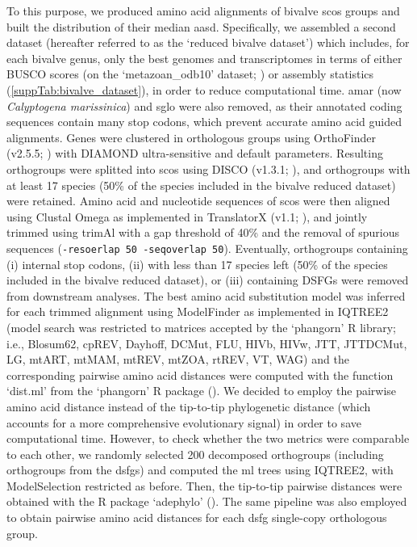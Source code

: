 To this purpose, we produced amino acid alignments of bivalve \glspl{sco} groups and built the distribution of their median \gls{aasd}. Specifically, we assembled a second dataset (hereafter referred to as the ‘reduced bivalve dataset’) which includes, for each bivalve genus, only the best genomes and transcriptomes in terms of either BUSCO scores (on the ‘metazoan\_odb10’ dataset; ) or assembly statistics (\cref{suppTab:bivalve_dataset}), in order to reduce computational time. \gls{amar} (now \textit{Calyptogena marissinica}) and \gls{sglo} were also removed, as their annotated coding sequences contain many stop codons, which prevent accurate amino acid guided alignments. Genes were clustered in orthologous groups using OrthoFinder (v2.5.5; ) with DIAMOND ultra-sensitive and default parameters. Resulting orthogroups were splitted into \glspl{sco} using DISCO (v1.3.1; ), and orthogroups with at least 17 species (50\% of the species included in the bivalve reduced dataset) were retained. Amino acid and nucleotide sequences of \glspl{sco} were then aligned using Clustal Omega as implemented in TranslatorX (v1.1; ), and jointly trimmed using trimAl with a gap threshold of 40\% and the removal of spurious sequences (\verb|-resoerlap 50 -seqoverlap 50|). Eventually, orthogroups containing (i) internal stop codons, (ii) with less than 17 species left (50\% of the species included in the bivalve reduced dataset), or (iii) containing DSFGs were removed from downstream analyses. The best amino acid substitution model was inferred for each trimmed alignment using ModelFinder as implemented in IQTREE2 (model search was restricted to matrices accepted by the ‘phangorn’ R library; i.e., Blosum62, cpREV, Dayhoff, DCMut, FLU, HIVb, HIVw, JTT, JTTDCMut, LG, mtART, mtMAM, mtREV, mtZOA, rtREV, VT, WAG) and the corresponding pairwise amino acid distances were computed with the function ‘dist.ml’ from the ‘phangorn’ R package (). We decided to employ the pairwise amino acid distance instead of the tip-to-tip phylogenetic distance (which accounts for a more comprehensive evolutionary signal) in order to save computational time. However, to check whether the two metrics were comparable to each other, we randomly selected 200 decomposed orthogroups (including orthogroups from the \glspl{dsfg}) and computed the \gls{ml} trees using IQTREE2, with ModelSelection restricted as before. Then, the tip-to-tip pairwise distances were obtained with the R package ‘adephylo’ (). The same pipeline was also employed to obtain pairwise amino acid distances for each \gls{dsfg} single-copy orthologous group.

